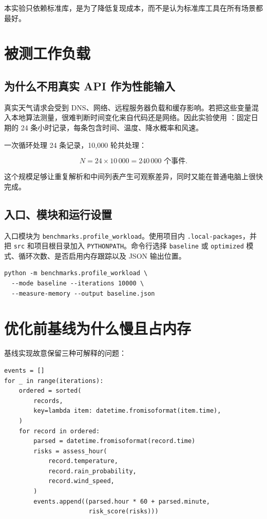 \documentclass[UTF8,zihao=-4,a4paper]{ctexart}
\newcommand{\code}[1]{\texttt{#1}}
\begin{document}
本实验只依赖标准库，是为了降低复现成本，而不是认为标准库工具在所有场景都最好。

\section{被测工作负载}

\subsection{为什么不用真实 API 作为性能输入}

真实天气请求会受到 DNS、网络、远程服务器负载和缓存影响。若把这些变量混入本地算法测量，很难判断时间变化来自代码还是网络。因此实验使用 ：固定日期的 24 条小时记录，每条包含时间、温度、降水概率和风速。

一次循环处理 24 条记录，10,000 轮共处理：

\[
N = 24 \times 10\,000 = 240\,000 \text{ 个事件}.
\]

这个规模足够让重复解析和中间列表产生可观察差异，同时又能在普通电脑上很快完成。

\subsection{入口、模块和运行设置}

入口模块为 \code{benchmarks.profile\_workload}。使用项目内 \code{.local-packages}，并把 \code{src} 和项目根目录加入 \code{PYTHONPATH}。命令行选择 \code{baseline} 或 \code{optimized} 模式、循环次数、是否启用内存跟踪以及 JSON 输出位置。

\begin{lstlisting}[style=shellstyle]
python -m benchmarks.profile_workload \
  --mode baseline --iterations 10000 \
  --measure-memory --output baseline.json
\end{lstlisting}

\section{优化前基线为什么慢且占内存}

基线实现故意保留三种可解释的问题：

\begin{lstlisting}[style=pythonstyle]
events = []
for _ in range(iterations):
    ordered = sorted(
        records,
        key=lambda item: datetime.fromisoformat(item.time),
    )
    for record in ordered:
        parsed = datetime.fromisoformat(record.time)
        risks = assess_hour(
            record.temperature,
            record.rain_probability,
            record.wind_speed,
        )
        events.append((parsed.hour * 60 + parsed.minute,
                       risk_score(risks)))
\end{lstlisting}
\end{document}
